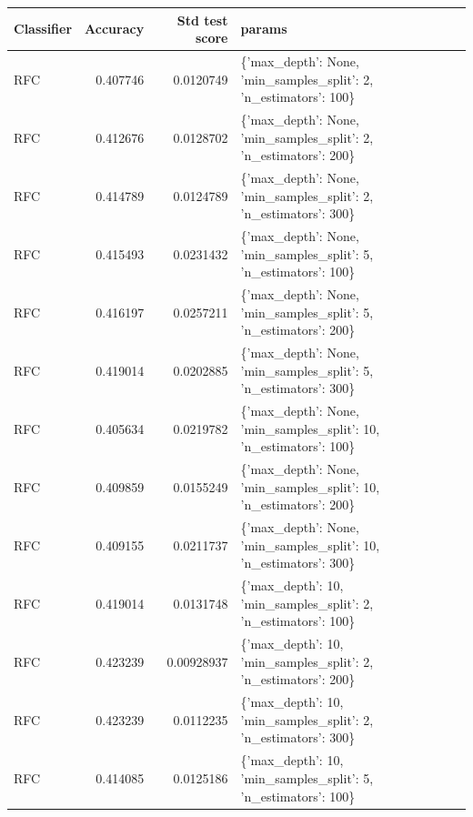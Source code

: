 \documentclass[conference,onecolumn]{IEEEtran}
\begin{document}
    \begin{table}
        \begin{center}
        \begin{longtable}{lrrl}
            \hline
             Classifier   &   Accuracy &   Std test score & params                                                            \\
            \hline
             RFC          &   0.407746 &       0.0120749  & \{'max\_depth': None, 'min\_samples\_split': 2, 'n\_estimators': 100\}  \\
             RFC          &   0.412676 &       0.0128702  & \{'max\_depth': None, 'min\_samples\_split': 2, 'n\_estimators': 200\}  \\
             RFC          &   0.414789 &       0.0124789  & \{'max\_depth': None, 'min\_samples\_split': 2, 'n\_estimators': 300\}  \\
             RFC          &   0.415493 &       0.0231432  & \{'max\_depth': None, 'min\_samples\_split': 5, 'n\_estimators': 100\}  \\
             RFC          &   0.416197 &       0.0257211  & \{'max\_depth': None, 'min\_samples\_split': 5, 'n\_estimators': 200\}  \\
             RFC          &   0.419014 &       0.0202885  & \{'max\_depth': None, 'min\_samples\_split': 5, 'n\_estimators': 300\}  \\
             RFC          &   0.405634 &       0.0219782  & \{'max\_depth': None, 'min\_samples\_split': 10, 'n\_estimators': 100\} \\
             RFC          &   0.409859 &       0.0155249  & \{'max\_depth': None, 'min\_samples\_split': 10, 'n\_estimators': 200\} \\
             RFC          &   0.409155 &       0.0211737  & \{'max\_depth': None, 'min\_samples\_split': 10, 'n\_estimators': 300\} \\
             RFC          &   0.419014 &       0.0131748  & \{'max\_depth': 10, 'min\_samples\_split': 2, 'n\_estimators': 100\}    \\
             RFC          &   0.423239 &       0.00928937 & \{'max\_depth': 10, 'min\_samples\_split': 2, 'n\_estimators': 200\}    \\
             RFC          &   0.423239 &       0.0112235  & \{'max\_depth': 10, 'min\_samples\_split': 2, 'n\_estimators': 300\}    \\
             RFC          &   0.414085 &       0.0125186  & \{'max\_depth': 10, 'min\_samples\_split': 5, 'n\_estimators': 100\}    \\

\end{longtable}
\end{center}
\end{table}
\end{document}
